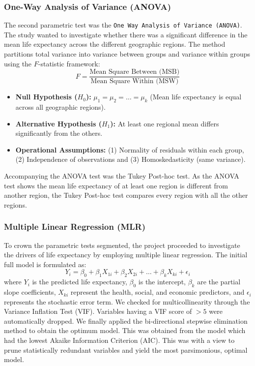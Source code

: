 \documentclass[3pt, a4paper]{article}
\begin{document}
\subsubsection{One-Way Analysis of Variance (ANOVA)}
The second parametric test was the \texttt{One Way Analysis of Variance (ANOVA)}. The study wanted to investigate whether there was a significant difference in the mean life expectancy across the different geographic regions. The method partitions total variance into variance between groups and variance within groups using the $F$-statistic framework:
$$F = \frac{\text{Mean Square Between (MSB)}}{\text{Mean Square Within (MSW)}}$$
\begin{itemize}[noitemsep,topsep=0pt]
    \item \textbf{Null Hypothesis ($H_0$):} $\mu_1 = \mu_2 = \dots = \mu_k$ (Mean life expectancy is equal across all geographic regions).
    \item \textbf{Alternative Hypothesis ($H_1$):} At least one regional mean differs significantly from the others.
    \item \textbf{Operational Assumptions:} (1) Normality of residuals within each group, (2) Independence of observations and (3) Homoskedasticity (same variance).
\end{itemize}
\noindent Accompanying the ANOVA test was the Tukey Post-hoc test. As the ANOVA test shows the mean life expectancy of at least one region is different from another region, the Tukey Post-hoc test compares every region with all the other regions.

\subsubsection{Multiple Linear Regression (MLR)}
To crown the parametric tests segmented, the project proceeded to investigate the drivers of life expectancy by employing multiple linear regression. The initial full model is formulated as:
$$Y_i = \beta_0 + \beta_1 X_{1i} + \beta_2 X_{2i} + \dots + \beta_k X_{ki} + \epsilon_i$$
where $Y_i$ is the predicted life expectancy, $\beta_0$ is the intercept, $\beta_k$ are the partial slope coefficients, $X_{ki}$ represent the health, social, and economic predictors, and $\epsilon_i$ represents the stochastic error term. We checked for multicollinearity through the Variance Inflation Test (VIF). Variables having a VIF score of $> 5$ were automatically dropped. We finally applied the bi-directional stepwise elimination method to obtain the optimum model. This was obtained from the model which had the lowest Akaike Information Criterion (AIC). This was with a view to prune statistically redundant variables and yield the most parsimonious, optimal model.
\end{document}
